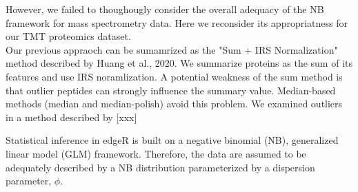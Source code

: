 \documentclass[11pt]{elife}\usepackage[]{graphicx}\usepackage[]{color}
\begin{document}
However, we failed to thoughougly
consider the overall adequacy of the NB framework for mass spectrometry data. 
Here we reconsider its appropriatness for our TMT proteomics dataset.  \\
Our previous appraoch can be sumamrized as the "Sum + IRS Normalization" method
described by Huang et al., 2020. We summarize proteins as the sum of its
features and use IRS noramlization. A potential weakness of the sum method is
that outlier peptides can strongly influence the summary value. Median-based
methods (median and median-polish) avoid this problem. We examined outliers in a
method described by [xxx]

Statistical inference in edgeR is built on a 
negative binomial (NB), generalized linear model (GLM) framework. 
Therefore, the data are assumed to be adequately described by a NB distribution 
parameterized by a dispersion parameter, $\phi$. \footnotemark{} \\


\end{document}
